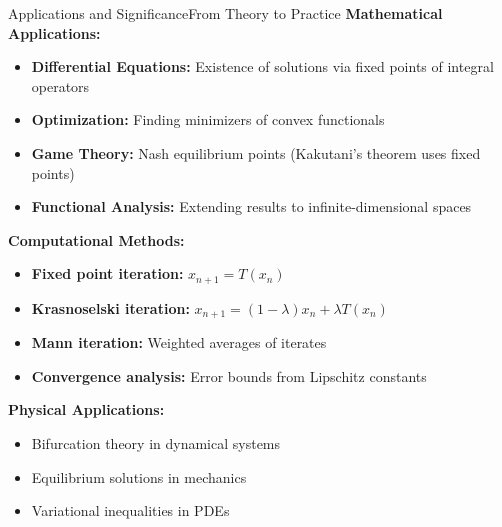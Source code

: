 \documentclass[aspectratio=169,10pt]{beamer}
\begin{document}
\begin{frame}{Applications and Significance}{From Theory to Practice}
    \textbf{Mathematical Applications:}
    \begin{itemize}
        \item \textbf{Differential Equations:} Existence of solutions via fixed points of integral operators
        \item \textbf{Optimization:} Finding minimizers of convex functionals
        \item \textbf{Game Theory:} Nash equilibrium points (Kakutani's theorem uses fixed points)
        \item \textbf{Functional Analysis:} Extending results to infinite-dimensional spaces
    \end{itemize}

    \vspace{0.3cm}
    \textbf{Computational Methods:}
    \begin{itemize}
        \item \textbf{Fixed point iteration:} $x_{n+1} = T(x_n)$
        \item \textbf{Krasnoselski iteration:} $x_{n+1} = (1-\lambda)x_n + \lambda T(x_n)$
        \item \textbf{Mann iteration:} Weighted averages of iterates
        \item \textbf{Convergence analysis:} Error bounds from Lipschitz constants
    \end{itemize}

    \vspace{0.3cm}
    \textbf{Physical Applications:}
    \begin{itemize}
        \item Bifurcation theory in dynamical systems
        \item Equilibrium solutions in mechanics
        \item Variational inequalities in PDEs
    \end{itemize}
\end{frame}
\end{document}
